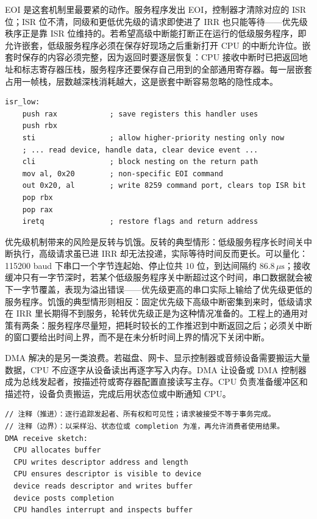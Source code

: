 EOI 是这套机制里最要紧的动作。服务程序发出 EOI，控制器才清除对应的 ISR 位；ISR 位不清，同级和更低优先级的请求即使进了 IRR 也只能等待——优先级秩序正是靠 ISR 位维持的。若希望高级中断能打断正在运行的低级服务程序，即允许嵌套，低级服务程序必须在保存好现场之后重新打开 CPU 的中断允许位。嵌套时保存的内容必须完整，因为返回时要逐层恢复：CPU 接收中断时已把返回地址和标志寄存器压栈，服务程序还要保存自己用到的全部通用寄存器。每一层嵌套占用一帧栈，层数越深栈消耗越大，这是嵌套中断容易忽略的隐性成本。

\begin{lstlisting}
isr_low:
    push rax            ; save registers this handler uses
    push rbx
    sti                 ; allow higher-priority nesting only now
    ; ... read device, handle data, clear device event ...
    cli                 ; block nesting on the return path
    mov al, 0x20        ; non-specific EOI command
    out 0x20, al        ; write 8259 command port, clears top ISR bit
    pop rbx
    pop rax
    iretq               ; restore flags and return address
\end{lstlisting}

优先级机制带来的风险是反转与饥饿。反转的典型情形：低级服务程序长时间关中断执行，高级请求虽已进 IRR 却无法投递，实际等待时间反而更长。可以量化：115200 baud 下串口一个字节连起始、停止位共 10 位，到达间隔约 $86.8\,\mu\text{s}$；接收缓冲只有一字节深时，若某个低级服务程序关中断超过这个时间，串口数据就会被下一字节覆盖，表现为溢出错误——优先级更高的串口实际上输给了优先级更低的服务程序。饥饿的典型情形则相反：固定优先级下高级中断密集到来时，低级请求在 IRR 里长期得不到服务，轮转优先级正是为这种情况准备的。工程上的通用对策有两条：服务程序尽量短，把耗时较长的工作推迟到中断返回之后；必须关中断的窗口要给出时间上界，而不是在未分析时间上界的情况下关闭中断。

DMA 解决的是另一类浪费。若磁盘、网卡、显示控制器或音频设备需要搬运大量数据，CPU 不应逐字从设备读出再逐字写入内存。DMA 让设备或 DMA 控制器成为总线发起者，按描述符或寄存器配置直接读写主存。CPU 负责准备缓冲区和描述符，设备负责搬运，完成后用状态位或中断通知 CPU。

\begin{lstlisting}
// 注释（推进）：逐行追踪发起者、所有权和可见性；请求被接受不等于事务完成。
// 注释（边界）：以采样沿、状态位或 completion 为准，再允许消费者使用结果。
DMA receive sketch:
  CPU allocates buffer
  CPU writes descriptor address and length
  CPU ensures descriptor is visible to device
  device reads descriptor and writes buffer
  device posts completion
  CPU handles interrupt and inspects buffer
\end{lstlisting}

